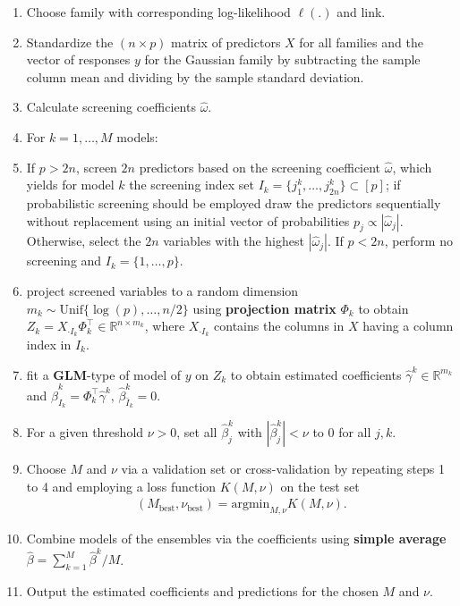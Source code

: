 \documentclass[
  article,
  nojss]{jss}
\providecommand{\tightlist}{%
  \setlength{\itemsep}{0pt}\setlength{\parskip}{0pt}}\usepackage{longtable,booktabs,array}
\begin{document}
\begin{enumerate}
\def\labelenumi{\arabic{enumi}.}
\tightlist
\item
  Choose family with corresponding log-likelihood \(\ell(.)\) and link.
\item
  Standardize the \((n\times p)\) matrix of predictors \(X\) for all
  families and the vector of responses \(y\) for the Gaussian family by
  subtracting the sample column mean and dividing by the sample standard
  deviation.
\item
  Calculate screening coefficients \(\hat\omega\).
\item
  For \(k=1,\dots,M\) models:
\item
  If \(p>2n\), screen \(2n\) predictors based on the screening
  coefficient \(\hat\omega\), which yields for model \(k\) the screening
  index set \(I_k=\{j_1^k,\dots,j_{2n}^k\}\subset[p]\); if probabilistic
  screening should be employed draw the predictors sequentially without
  replacement using an initial vector of probabilities
  \(p_j\propto |\hat\omega_j|\). Otherwise, select the \(2n\) variables
  with the highest \(|\hat\omega_j|\). If \(p < 2n\), perform no
  screening and \(I_k=\{1,\dots,p\}\).
\item
  project screened variables to a random dimension
  \(m_k\sim \text{Unif}\{\log(p),\dots,n/2\}\) using
  \textbf{projection matrix} \(\Phi_k\) to obtain
  \(Z_k=X_{\cdot I_k}\Phi_k^\top \in \mathbb{R}^{n\times m_k}\), where
  \(X_{\cdot I_k}\) contains the columns in \(X\) having a column index
  in \(I_k\).
\item
  fit a \textbf{GLM}-type of model of \(y\) on \(Z_k\) to obtain
  estimated coefficients \(\widehat\gamma^k\in\mathbb{R}^{m_k}\) and
  \(\hat \beta_{I_k}^k=\Phi_k^\top\widehat\gamma^k\),
  \(\hat \beta_{\bar I_k}^k=0\).
\item
  For a given threshold \(\nu>0\), set all \(\hat\beta_j^k\) with
  \(|\hat\beta_j^k|<\nu\) to \(0\) for all \(j,k\).
\item
  Choose \(M\) and \(\nu\) via a validation set or cross-validation by
  repeating steps 1 to 4 and employing a loss function \(K(M, \nu)\) on
  the test set \begin{align*}
  (M_{\text{best}},\nu_{\text{best}}) = \text{argmin}_{M,\nu}K(M,\nu).
  \end{align*}
\item
  Combine models of the ensembles via the coefficients using
  \textbf{simple average} \(\hat \beta = \sum_{k=1}^M\hat \beta^k / M\).
\item
  Output the estimated coefficients and predictions for the chosen \(M\)
  and \(\nu\).
\end{enumerate}
\end{document}
